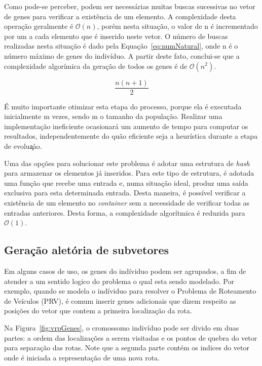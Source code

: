 \documentclass[12pt]{article}
\begin{document}
Como pode-se perceber, podem ser necess\'{a}rias muitas buscas sucessivas no vetor de genes para verificar
a exist\^{e}ncia de um elemento. A complexidade desta opera\c{c}\~{a}o geralmente \'{e} $\mathcal{O}(n)$,
por\'{e}m nesta situa\c{c}\~{a}o, o valor de n \'{e} incrementado por um a cada elemento que \'{e} inserido
neste vetor. O n\'{u}mero de buscas realizadas nesta situa\c{c}\~{a}o \'{e} dado pela
Equa\c{c}\~{a}o~\ref{eq:numNatural}, onde n \'{e} o n\'{u}mero m\'{a}ximo de genes do indiv\'{i}duo. A partir
deste fato, conclui-se que a complexidade algor\'{i}mica da gera\c{c}\~{a}o de todos os genes \'{e} de
$\mathcal{O}(n^2)$.

\begin{equation}
    \frac{n(n+1)}{2}
    \label{eq:numNatural}
\end{equation}

\'{E} muito importante otimizar esta etapa do processo, porque ela \'{e} executada inicialmente m vezes, sendo
m o tamanho da popula\c{c}\~{a}o. Realizar uma implementa\c{c}\~{a}o ineficiente ocasionar\'{a} um aumento de
tempo para computar os resultados, independentemente do qu\~{a}o eficiente seja a heur\'{i}stica durante a etapa
de evolu\c{a}\`{a}o.

Uma das op\c{c}\~{o}es para solucionar este problema \'{e} adotar uma estrutura de \textit{hash} para armazenar os
elementos j\'{a} inseridos. Para este tipo de estrutura, \'{e} adotada uma fun\c{c}\~{a}o que recebe uma entrada e,
numa situa\c{c}\~{a}o ideal, produz uma sa\'{i}da exclusiva para esta determinada entrada. Desta maneira, \'{e}
poss\'{i}vel verificar a exist\^{e}ncia de um elemento no \textit{container} sem a necessidade de verificar todas
as entradas anteriores. Desta forma, a complexidade algor\'{i}tmica \'{e} reduzida para $\mathcal{O}(1)$.

\subsection{Gera\c{c}\~{a}o alet\'{o}ria de subvetores}

Em alguns casos de uso, os genes do ind\'{i}viduo podem ser agrupados, a fim de atender a um sentido logico do problema
o qual esta sendo modelado. Por exemplo, quando se modela o ind\'{i}viduo para resolver o Problema de Roteamento de
Ve\'{i}culos (PRV), \'{e} comum inserir genes adicionais que dizem respeito as posi\c{c}\~{o}es do vetor que contem a primeira
localiza\c{c}\~{a}o da rota.

Na Figura~\ref{fig:vrpGenes}, o cromossomo indiv\'{i}duo pode ser divido em duas partes: a ordem das localiza\c{c}\~{o}es
a serem visitadas e os pontos de quebra do vetor para separa\c{c}\~{a}o das rotas. Note que a segunda parte cont\'{e}m os
indices do vetor onde \'{e} iniciada a representa\c{c}\~{a}o de uma nova rota.
\end{document}

